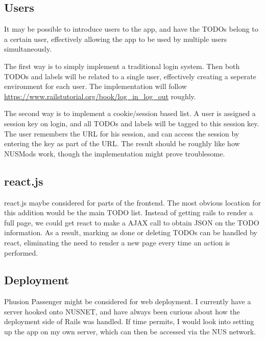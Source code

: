 \documentclass[12pt]{article}
\begin{document}
\subsection*{Users}

It may be possible to introduce users to the app, and have the TODOs belong to a certain user, effectively allowing the app to be used by multiple users simultaneously.

The first way is to simply implement a traditional login system. Then both TODOs and labels will be related to a single user, effectively creating a seperate environment for each user. The implementation will follow \url{https://www.railstutorial.org/book/log\_in\_log\_out} roughly.

The second way is to implement a cookie/session based list. A user is assigned a session key on login, and all TODOs and labels will be tagged to this session key. The user remembers the URL for his session, and can access the session by entering the key as part of the URL\@. The result should be roughly like how NUSMods work, though the implementation might prove troublesome.

\subsection*{react.js}

react.js maybe considered for parts of the frontend. The most obvious location for this addition would be the main TODO list. Instead of getting rails to render a full page, we could get react to make a AJAX call to obtain JSON on the TODO information. As a result, marking as done or deleting TODOs can be handled by react, eliminating the need to render a new page every time an action is performed.

\subsection*{Deployment}

Phusion Passenger might be considered for web deployment. I currently have a server hooked onto NUSNET, and have always been curious about how the deployment side of Rails was handled. If time permits, I would look into setting up the app on my own server, which can then be accessed via the NUS network.
\end{document}
